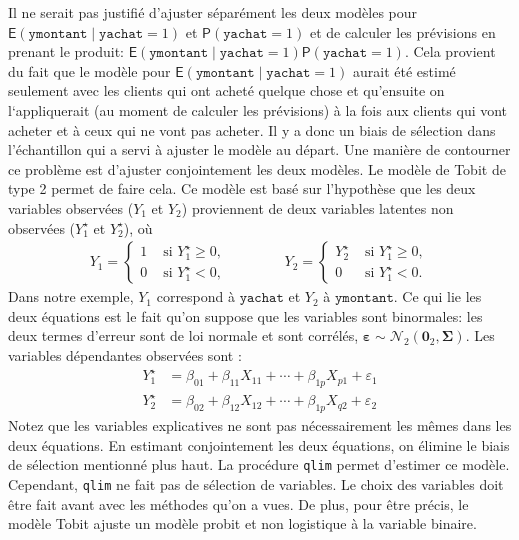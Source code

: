 \documentclass[
  11pt,
  letterpaper,
]{book}
\theoremstyle{definition}
\theoremstyle{definition}
\theoremstyle{definition}
\theoremstyle{remark}
\begin{document}
Il ne serait pas justifié d'ajuster séparément les deux modèles pour \({\mathsf E}\left(\texttt{ymontant} \mid \texttt{yachat}=1\right)\) et \({\mathsf P}\left(\texttt{yachat}=1\right)\) et de calculer les prévisions en prenant le produit: \({\mathsf E}\left(\texttt{ymontant} \mid \texttt{yachat}=1\right){\mathsf P}\left(\texttt{yachat}=1\right)\). Cela provient du fait que le modèle pour \({\mathsf E}\left(\texttt{ymontant} \mid \texttt{yachat}=1\right)\) aurait été estimé seulement avec les clients qui ont acheté quelque chose et qu'ensuite on l`appliquerait (au moment de calculer les prévisions) à la fois aux clients qui vont acheter et à ceux qui ne vont pas acheter. Il y a donc un biais de sélection dans l'échantillon qui a servi à ajuster le modèle au départ. Une manière de contourner ce problème est d'ajuster conjointement les deux modèles. Le modèle de Tobit de type 2 permet de faire cela. Ce modèle est basé sur l'hypothèse que les deux variables observées (\(Y_1\) et \(Y_2\)) proviennent de deux variables latentes non observées (\(Y_1^{\star}\) et \(Y_2^{\star}\)), où
\begin{align*}
Y_1 = \begin{cases}
1 & \text{ si } Y_1^{\star} \ge 0, \\
0 & \text{ si } Y_1^{\star} < 0,
\end{cases}
\qquad \qquad 
Y_2 = \begin{cases}
Y_2^{\star} & \text{ si } Y_1^{\star} \ge 0, \\
0 & \text{ si } Y_1^{\star} < 0.
\end{cases}
\end{align*}
Dans notre exemple, \(Y_1\) correspond à \(\texttt{yachat}\) et \(Y_2\) à \(\texttt{ymontant}\).
Ce qui lie les deux équations est le fait qu'on suppose que les variables sont binormales: les deux termes d'erreur sont de loi normale et sont corrélés, \(\boldsymbol{\varepsilon} \sim \mathcal{N}_2(\boldsymbol{0}_2, \boldsymbol{\Sigma})\). Les variables dépendantes observées sont :
\begin{align*}
Y_{1}^{\star} &= \beta_{01} + \beta_{11} X_{11} + \cdots + \beta_{1p}X_{p1} + \varepsilon_{1}\\
Y_{2}^{\star} &= \beta_{02} + \beta_{12} X_{12} + \cdots + \beta_{1p}X_{q2} + \varepsilon_{2}
\end{align*}
Notez que les variables explicatives ne sont pas nécessairement les mêmes dans les deux équations. En estimant conjointement les deux équations, on élimine le biais de sélection mentionné plus haut. La procédure \texttt{qlim} permet d'estimer ce modèle. Cependant, \texttt{qlim} ne fait pas de sélection de variables. Le choix des variables doit être fait avant avec les méthodes qu'on a vues. De plus, pour être précis, le modèle Tobit ajuste un modèle probit et non logistique à la variable binaire.
\end{document}
